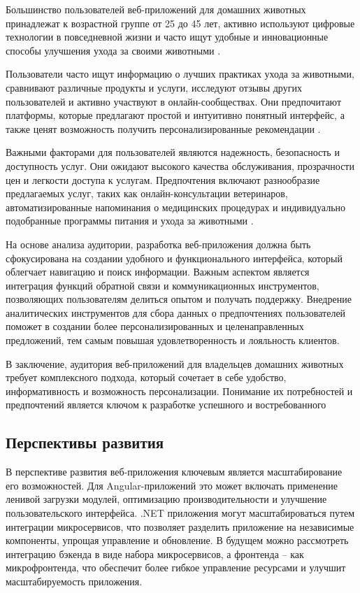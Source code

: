 Большинство пользователей веб-приложений для домашних животных принадлежат к возрастной группе от 25 до 45 лет, активно используют цифровые технологии в повседневной жизни и часто ищут удобные и инновационные способы улучшения ухода за своими животными \cite{freedman}.

Пользователи часто ищут информацию о лучших практиках ухода за животными, сравнивают различные продукты и услуги, исследуют отзывы других пользователей и активно участвуют в онлайн-сообществах. Они предпочитают платформы, которые предлагают простой и интуитивно понятный интерфейс, а также ценят возможность получить персонализированные рекомендации \cite{market}.

Важными факторами для пользователей являются надежность, безопасность и доступность услуг. Они ожидают высокого качества обслуживания, прозрачности цен и легкости доступа к услугам. Предпочтения включают разнообразие предлагаемых услуг, таких как онлайн-консультации ветеринаров, автоматизированные напоминания о медицинских процедурах и индивидуально подобранные программы питания и ухода за животными \cite{freedman}.

На основе анализа аудитории, разработка веб-приложения должна быть сфокусирована на создании удобного и функционального интерфейса, который облегчает навигацию и поиск информации. Важным аспектом является интеграция функций обратной связи и коммуникационных инструментов, позволяющих пользователям делиться опытом и получать поддержку. Внедрение аналитических инструментов для сбора данных о предпочтениях пользователей поможет в создании более персонализированных и целенаправленных предложений, тем самым повышая удовлетворенность и лояльность клиентов.

В заключение, аудитория веб-приложений для владельцев домашних животных требует комплексного подхода, который сочетает в себе удобство, информативность и возможность персонализации. Понимание их потребностей и предпочтений является ключом к разработке успешного и востребованного

\subsection{Перспективы развития}

В перспективе развития веб-приложения ключевым является масштабирование его возможностей. Для Angular-приложений это может включать применение ленивой загрузки модулей, оптимизацию производительности и улучшение пользовательского интерфейса. .NET приложения могут масштабироваться путем интеграции микросервисов, что позволяет разделить приложение на независимые компоненты, упрощая управление и обновление. В будущем можно рассмотреть интеграцию бэкенда в виде набора микросервисов, а фронтенда – как микрофронтенда, что обеспечит более гибкое управление ресурсами и улучшит масштабируемость приложения.

